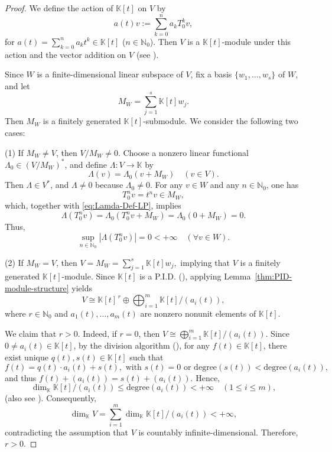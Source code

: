 \documentclass[11pt]{amsart}
\theoremstyle{definition}
\theoremstyle{remark}
\theoremstyle{plain}
\begin{document}
\begin{proof}
We define the action of $\mathbb{K}[t]$ on
$V$ by
\[
a(t) v:=\sum_{k=0}^{n}a_k T_0^kv,
\]
for $a(t)=\sum_{k=0}^{n}a_k t^k\in \mathbb{K}[t]$
($n\in \mathbb{N}_0$). Then \(V\) is a \(\mathbb{K}[t]\)-module under this action
and the vector addition on \(V\) (see \cite[Sec.~10.1, Example: \(F\lbrack x\rbrack\)-modules]{DF}).

Since $W$ is a finite-dimensional linear subspace
of $V$, fix a basis
\(\{w_1,\ldots,w_s\}\)
of \(W\), and let
\[
M_W=\sum_{j=1}^s\mathbb{K}[t] w_j.
\]
Then $M_{W}$ is a finitely generated
\(\mathbb{K}[t]\)-submodule.
We consider the following two cases:

(1) If \(M_W\ne V\), then \(V/M_W\ne0\).
Choose a nonzero linear functional
\(\Lambda_0\in (V/M_W)^*\), and define
\(\Lambda: V\to\mathbb{K}\) by
\begin{equation}\label{eq:Lamda-Def-LP}
\Lambda(v)=\Lambda_0(v+M_W)
\quad (v\in V).
\end{equation}
Then \(\Lambda\in V^*\), and
$\Lambda\neq 0$ because $\Lambda_0\neq 0$.
For any \(v\in W\) and any \(n\in\mathbb{N}_0\), one has
\[
T_0^n v=t^n v\in M_W,
\]
which, together with \eqref{eq:Lamda-Def-LP}, implies
\[
\Lambda(T_0^n v)=
\Lambda_0(T_0^n v+M_W)
=\Lambda_0(0+M_W)
=0.
\]
Thus,
\[
\sup_{n\in\mathbb{N}_0}
|\Lambda(T_0^n v)|
=0 < +\infty \quad
(\forall v\in W).
\]

(2)
If \(M_W=V\), then
\(V=M_W=\sum_{j=1}^s\mathbb{K}[t]w_j,\)
implying that \(V\) is a finitely generated
\(\mathbb{K}[t]\)-module.
Since \(\mathbb{K}[t]\) is a P.I.D.
(\cite[Sec.~8.1, Proposition and Sec.~9.2, Theorem~3]{DF}),
applying Lemma~\ref{thm:PID-module-structure} yields
\[
V
\cong
\mathbb{K}[t]^{\,r}
\oplus
\bigoplus_{i=1}^{m}\mathbb{K}[t]\big/(a_i(t)),
\]
where \(r\in\mathbb{N}_0\) and
\(a_1(t),\ldots,a_m(t)\) are nonzero nonunit elements of \(\mathbb{K}[t]\).

We claim that \(r>0\).
Indeed, if \(r=0\), then
\(
V
\cong
\bigoplus_{i=1}^{m}\mathbb{K}[t]\big/(a_i(t)).
\)
Since $0\neq a_i(t)\in \mathbb{K}[t]$, by the division algorithm
(\cite[Sec.~9.2, Theorem~3]{DF}), for any $f(t)\in \mathbb{K}[t]$,
there exist unique $q(t), s(t)\in \mathbb{K}[t]$ such that
\[
f(t)=q(t)\cdot a_i(t)+s(t),
\text{ with }
s(t)=0\text{ or }
\mathrm{degree}(s(t))<\mathrm{degree}(a_i(t)),
\]
and thus \(f(t)+(a_i(t))=s(t)+(a_i(t))\).
Hence,
\[
\dim_{\mathbb{K}}\mathbb{K}[t]\big/(a_i(t))
\leq \mathrm{degree}(a_i(t))
<+\infty
\quad(1\le i\le m),
\]
(also see \cite[Sec. 11.1, Page~411, Example~(2)]{DF}).
Consequently,
\[
\dim_{\mathbb{K}} V
=\sum_{i=1}^{m}
\dim_{\mathbb{K}}\mathbb{K}[t]\big/(a_i(t))
<+\infty,
\]
contradicting the assumption that \(V\) is countably infinite-dimensional.
Therefore, \(r>0\).


\end{proof}
\end{document}
